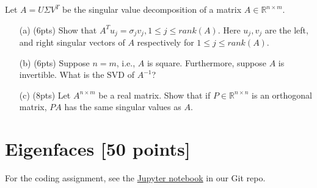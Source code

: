 Let $A=U\Sigma V^T$ be the singular value decomposition of a matrix $A \in \mathbb{R}^{n \times m}$. 
 
 \begin{itemize}
 	
 	
 	\item[(a)](6pts)  Show that $A^T u_j = \sigma_j v_j, 1\leq j \leq rank(A)$. Here $u_j, v_j$ are the left, and right singular vectors of $A$ respectively  for $1\leq j \leq rank(A)$.
 	
 	\item[(b)](6pts) Suppose $n=m$, i.e., $A$ is square. Furthermore, suppose $A$ is invertible. What is the SVD of $A^{-1}$? 
 	
 	
 	\item[(c)](8pts)  Let $A^{n \times m}$ be a real matrix. Show that if $P \in \mathbb{R}^{n \times n}$ is an orthogonal matrix, $PA$ has the same singular values as $A$. \\ 
 	
\end{itemize}

 
\section{Eigenfaces [50 points]} 

For the coding assignment, see the  \href{https://github.com/tsourolampis/cs365-spring22/blob/main/hws/hw8/PA8-STUDENT.ipynb}{Jupyter notebook} in our Git repo. 

